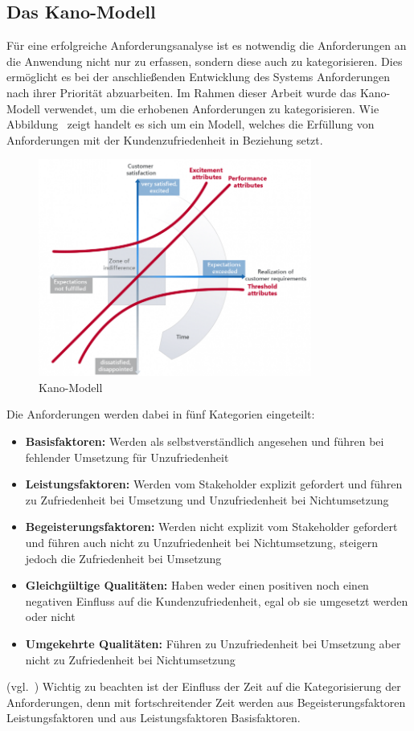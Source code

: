 \subsection{Das Kano-Modell}\label{subsec:kano-modell}
Für eine erfolgreiche Anforderungsanalyse ist es notwendig die Anforderungen an die Anwendung nicht nur zu erfassen,
sondern diese auch zu kategorisieren.
Dies ermöglicht es bei der anschließenden Entwicklung des Systems Anforderungen nach ihrer Priorität abzuarbeiten.
Im Rahmen dieser Arbeit wurde das Kano-Modell verwendet, um die erhobenen Anforderungen zu kategorisieren.
Wie Abbildung~ zeigt handelt es sich um ein Modell, welches die Erfüllung von Anforderungen mit
der Kundenzufriedenheit in Beziehung setzt.

\begin{figure}[ht]
    \centering
    \includegraphics[width=0.8\textwidth]{images/Kano-Model}
    \caption{Kano-Modell~\autocite{kano-model}}
    \label{fig:kano_model}
\end{figure}

Die Anforderungen werden dabei in fünf Kategorien eingeteilt:

\begin{itemize}
    \item \textbf{Basisfaktoren:} Werden als selbstverständlich angesehen und führen bei fehlender Umsetzung für Unzufriedenheit
    \item \textbf{Leistungsfaktoren:} Werden vom Stakeholder explizit gefordert und führen zu Zufriedenheit bei Umsetzung
    und Unzufriedenheit bei Nichtumsetzung
    \item \textbf{Begeisterungsfaktoren:} Werden nicht explizit vom Stakeholder gefordert und führen auch nicht zu Unzufriedenheit
    bei Nichtumsetzung, steigern jedoch die Zufriedenheit bei Umsetzung
    \item \textbf{Gleichgültige Qualitäten:} Haben weder einen positiven noch einen negativen Einfluss auf die Kundenzufriedenheit,
    egal ob sie umgesetzt werden oder nicht
    \item \textbf{Umgekehrte Qualitäten:} Führen zu Unzufriedenheit bei Umsetzung aber nicht zu Zufriedenheit bei Nichtumsetzung
\end{itemize} (vgl.~\autocite{kano-model})
Wichtig zu beachten ist der Einfluss der Zeit auf die Kategorisierung der Anforderungen, denn mit fortschreitender Zeit werden
aus Begeisterungsfaktoren Leistungsfaktoren und aus Leistungsfaktoren Basisfaktoren.

